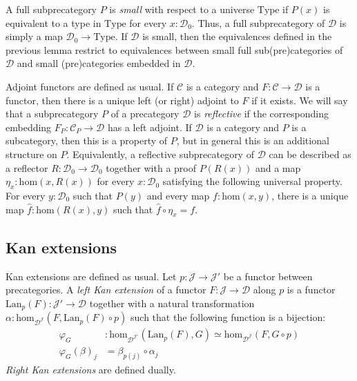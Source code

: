 \documentclass[reqno]{amsart}
\theoremstyle{definition}
\theoremstyle{remark}
\newcommand{\fs}[1]{\mathrm{#1}}
\newcommand{\scat}[1]{\mathcal{#1}}
\renewcommand{\hom}{\fs{hom}}
\newcommand{\uType}{\fs{Type}}
\newcommand{\ob}[1]{#1_0}
\newcommand{\Prop}{\fs{Prop}}
\newcommand{\El}{\fs{El}}
\numberwithin{figure}{section}
\begin{document}
A full subprecategory $P$ is \emph{small} with respect to a universe $\uType$ if $P(x)$ is equivalent to a type in $\uType$ for every $x : \ob{\scat{D}}$.
Thus, a full subprecategory of $\scat{D}$ is simply a map $\ob{\scat{D}} \to \uType$.
If $\scat{D}$ is small, then the equivalences defined in the previous lemma restrict to equivalences between small full sub(pre)categories of $\scat{D}$ and small (pre)categories embedded in $\scat{D}$.


Adjoint functors are defined as usual.
If $\scat{C}$ is a category and $F : \scat{C} \to \scat{D}$ is a functor, then there is a unique left (or right) adjoint to $F$ if it exists.
We will say that a subprecategory $P$ of a precategory $\scat{D}$ is \emph{reflective} if the corresponding embedding $F_P : \scat{C}_P \to \scat{D}$ has a left adjoint.
If $\scat{D}$ is a category and $P$ is a subcategory, then this is a property of $P$, but in general this is an additional structure on $P$.
Equivalently, a reflective subprecategory of $\scat{D}$ can be described as a reflector $R : \ob{\scat{D}} \to \ob{\scat{D}}$
together with a proof $P(R(x))$ and a map $\eta_x : \hom(x,R(x))$ for every $x : \ob{\scat{D}}$ satisfying the following universal property.
For every $y : \scat{D}_0$ such that $P(y)$ and every map $f : \hom(x,y)$, there is a unique map $\widehat{f} : \hom(R(x),y)$ such that $\widehat{f} \circ \eta_x = f$.

\subsection{Kan extensions}

Kan extensions are defined as usual.
Let $p : \scat{J} \to \scat{J}'$ be a functor between precategories.
A \emph{left Kan extension} of a functor $F : \scat{J} \to \scat{D}$ along $p$ is a functor $\fs{Lan}_p(F) : \scat{J}' \to \scat{D}$
together with a natural transformation $\alpha : \hom_{\scat{D}^\scat{J}}(F, \fs{Lan}_p(F) \circ p)$ such that the following function is a bijection:
\begin{align*}
\varphi_G & : \hom_{\scat{D}^{\scat{J}'}}(\fs{Lan}_p(F),G) \simeq \hom_{\scat{D}^\scat{J}}(F, G \circ p) \\
\varphi_G(\beta)_j & = \beta_{p(j)} \circ \alpha_j
\end{align*}
\emph{Right Kan extensions} are defined dually.
\end{document}
